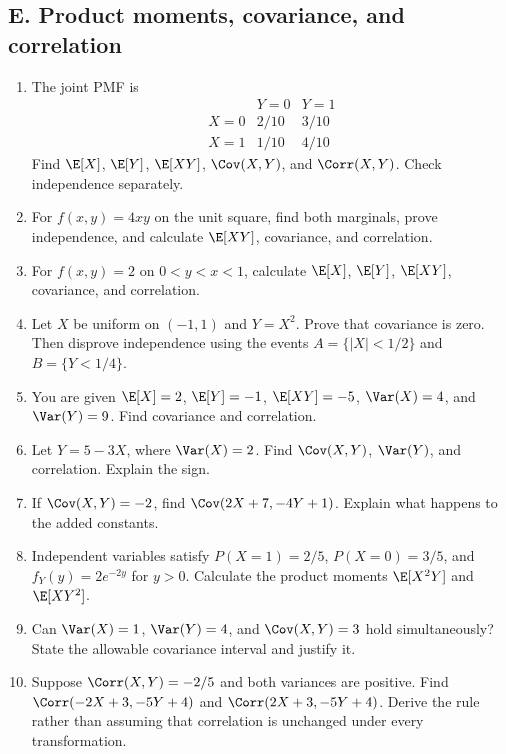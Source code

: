 \subsection{E. Product moments, covariance, and correlation}
\begin{enumerate}[label=\textbf{E\arabic*.},leftmargin=*,itemsep=0.75em]
\item The joint PMF is
\[
\begin{array}{c|cc}
 &Y=0&Y=1\\\hline
X=0&2/10&3/10\\
X=1&1/10&4/10
\end{array}
\]
Find $\E[X]$, $\E[Y]$, $\E[XY]$, $\Cov(X,Y)$, and $\Corr(X,Y)$. Check independence separately.
\item For $f(x,y)=4xy$ on the unit square, find both marginals, prove independence, and calculate $\E[XY]$, covariance, and correlation.
\item For $f(x,y)=2$ on $0<y<x<1$, calculate $\E[X]$, $\E[Y]$, $\E[XY]$, covariance, and correlation.
\item Let $X$ be uniform on $(-1,1)$ and $Y=X^2$. Prove that covariance is zero. Then disprove independence using the events $A=\{|X|<1/2\}$ and $B=\{Y<1/4\}$.
\item You are given $\E[X]=2$, $\E[Y]=-1$, $\E[XY]=-5$, $\Var(X)=4$, and $\Var(Y)=9$. Find covariance and correlation.
\item Let $Y=5-3X$, where $\Var(X)=2$. Find $\Cov(X,Y)$, $\Var(Y)$, and correlation. Explain the sign.
\item If $\Cov(X,Y)=-2$, find $\Cov(2X+7,-4Y+1)$. Explain what happens to the added constants.
\item Independent variables satisfy $P(X=1)=2/5$, $P(X=0)=3/5$, and $f_Y(y)=2e^{-2y}$ for $y>0$. Calculate the product moments $\E[X^2Y]$ and $\E[XY^2]$.
\item Can $\Var(X)=1$, $\Var(Y)=4$, and $\Cov(X,Y)=3$ hold simultaneously? State the allowable covariance interval and justify it.
\item Suppose $\Corr(X,Y)=-2/5$ and both variances are positive. Find $\Corr(-2X+3,-5Y+4)$ and $\Corr(2X+3,-5Y+4)$. Derive the rule rather than assuming that correlation is unchanged under every transformation.
\end{enumerate}

